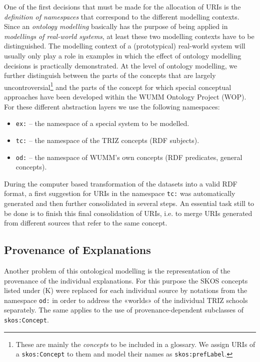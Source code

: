 \documentclass[11pt,a4paper]{article}
\begin{document}
One of the first decisions that must be made for the allocation of URIs is the
\emph{definition of namespaces} that correspond to the different modelling
contexts. Since an \emph{ontology modelling} basically has the purpose of
being applied in \emph{modellings of real-world systems}, at least these two
modelling contexts have to be distinguished. The modelling context of a
(prototypical) real-world system will usually only play a role in examples in
which the effect of ontology modelling decisions is practically demonstrated.
At the level of ontology modelling, we further distinguish between the parts
of the concepts that are largely uncontroversial\footnote{These are mainly the
  \emph{concepts} to be included in a glossary. We assign URIs of a
  \texttt{skos:Concept} to them and model their names as
  \texttt{skos:prefLabel}.} and the parts of the concept for which special
conceptual approaches have been developed within the WUMM Ontology Project
(WOP).  For these different abstraction layers we use the following
namespaces:
\begin{itemize}[noitemsep]
\item \texttt{ex:} -- the namespace of a special system to be modelled. 
\item \texttt{tc:} -- the namespace of the TRIZ concepts (RDF subjects).
\item \texttt{od:} -- the namespace of WUMM's own concepts (RDF predicates,
  general concepts). 
\end{itemize}

During the computer based transformation of the datasets into a valid RDF
format, a first suggestion for URIs in the namespace \texttt{tc:} was
automatically generated and then further consolidated in several steps. An
essential task still to be done is to finish this final consolidation of URIs,
i.e. to merge URIs generated from different sources that refer to the same
concept.

\subsection{Provenance of Explanations}

Another problem of this ontological modelling is the representation of the
provenance of the individual explanations. For this purpose the SKOS concepts
listed under (K) were replaced for each individual source by notations from
the namespace \texttt{od:} in order to address the «worlds» of the individual
TRIZ schools separately.  The same applies to the use of provenance-dependent
subclasses of \texttt{skos:Concept}.
\end{document}
